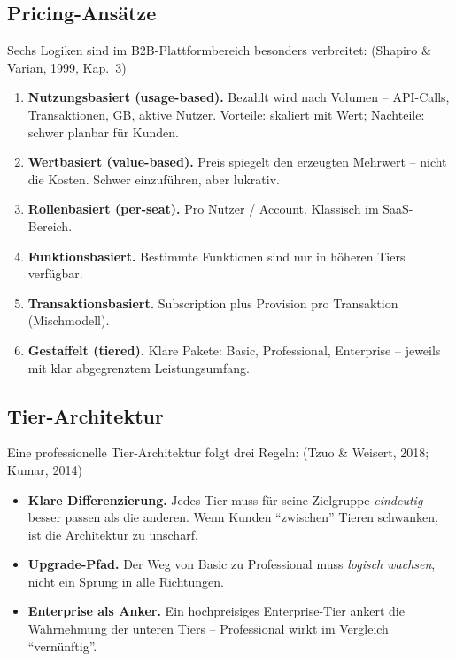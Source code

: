 \documentclass[11pt,a4paper,oneside]{article}
\newcommand{\quelle}[1]{{\footnotesize\color{lpGray}(#1)}}
\begin{document}
\subsection{Pricing-Ansätze}

Sechs Logiken sind im B2B-Plattformbereich besonders verbreitet: \quelle{Shapiro \& Varian, 1999, Kap.~3}

\begin{enumerate}
  \item \textbf{Nutzungsbasiert (usage-based).} Bezahlt wird nach Volumen -- API-Calls, Transaktionen, GB, aktive Nutzer. Vorteile: skaliert mit Wert; Nachteile: schwer planbar für Kunden.
  \item \textbf{Wertbasiert (value-based).} Preis spiegelt den erzeugten Mehrwert -- nicht die Kosten. Schwer einzuführen, aber lukrativ.
  \item \textbf{Rollenbasiert (per-seat).} Pro Nutzer / Account. Klassisch im SaaS-Bereich.
  \item \textbf{Funktionsbasiert.} Bestimmte Funktionen sind nur in höheren Tiers verfügbar.
  \item \textbf{Transaktionsbasiert.} Subscription plus Provision pro Transaktion (Mischmodell).
  \item \textbf{Gestaffelt (tiered).} Klare Pakete: Basic, Professional, Enterprise -- jeweils mit klar abgegrenztem Leistungsumfang.
\end{enumerate}

\subsection{Tier-Architektur}

Eine professionelle Tier-Architektur folgt drei Regeln: \quelle{Tzuo \& Weisert, 2018; Kumar, 2014}

\begin{itemize}
  \item \textbf{Klare Differenzierung.} Jedes Tier muss für seine Zielgruppe \emph{eindeutig} besser passen als die anderen. Wenn Kunden ``zwischen'' Tieren schwanken, ist die Architektur zu unscharf.
  \item \textbf{Upgrade-Pfad.} Der Weg von Basic zu Professional muss \emph{logisch wachsen}, nicht ein Sprung in alle Richtungen.
  \item \textbf{Enterprise als Anker.} Ein hochpreisiges Enterprise-Tier ankert die Wahrnehmung der unteren Tiers -- Professional wirkt im Vergleich ``vernünftig''.
\end{itemize}
\end{document}
